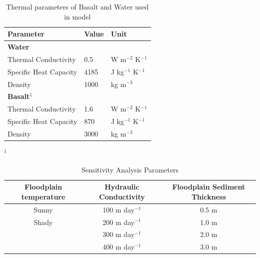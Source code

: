 \documentclass[letterpaper, 11pt]{article}
\begin{document}
\begin{table}[h]
    \centering
    \begin{tabular}{l l l}
    \hline
    \textbf{Parameter} & \textbf{Value} & \textbf{Unit}\\
    \hline
    \textbf{Water} & & \\
    \hspace{6pt} Thermal Conductivity & 0.5 & W m$^{-2}$ K$^{-1}$ \\
    \hspace{6pt} Specific Heat Capacity & 4185 & J kg$^{-1}$ K$^{-1}$ \\
    \hspace{6pt} Density & 1000 & kg m$^{-3}$ \\
    \textbf{Basalt}$^1$ & & \\
     \hspace{6pt} Thermal Conductivity & 1.6 & W m$^{-2}$ K$^{-1}$ \\
    \hspace{6pt} Specific Heat Capacity & 870 & J kg$^{-1}$ K$^{-1}$ \\
    \hspace{6pt} Density & 3000 & kg m$^{-3}$ \\
\end{tabular}

$^1$\parencite{Waples2004ARocks}

    \caption{Thermal parameters of Basalt and Water used in model}
    \label{table:thermalparams}
\end{table}

\begin{table}[!h]
    \centering
    \begin{tabular}{c|c|c}
        \textbf{Floodplain temperature} & \textbf{Hydraulic Conductivity} & \textbf{Floodplain Sediment Thickness} \\
        \hline
        Sunny &  100 m day$^{-1}$ & 0.5 m\\
        Shady &  200 m day$^{-1}$ & 1.0 m\\
         & 300 m day$^{-1}$ & 2.0 m\\
         & 400 m day$^{-1}$ & 3.0 m\\
    \end{tabular}
    \caption{Sensitivity Analysis Parameters}
    \label{table:sensitivityparams}
\end{table}
\end{document}

